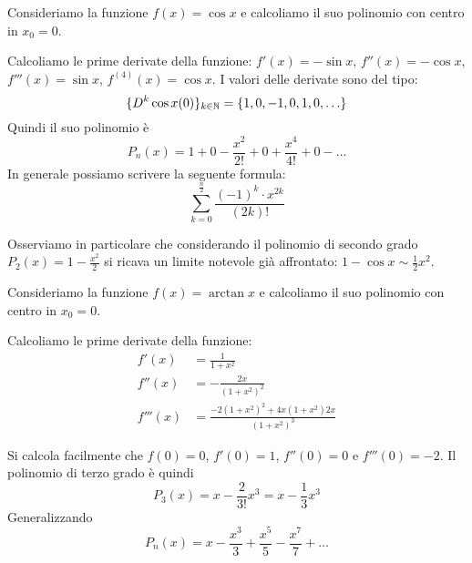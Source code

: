 \begin{example}
Consideriamo la funzione $f(x) = \cos x$ e calcoliamo il suo polinomio con centro in $x_0 = 0$.

Calcoliamo le prime derivate della funzione: $f'(x) = -\sin x$, $f''(x) = -\cos x$, $f'''(x) = \sin x$, $f^{(4)}(x) = \cos x$. I valori delle derivate sono del tipo:
\begin{equation*}
\{D^k \cos x (0)\}_{k \in \mathbb N} = \{1, 0, -1, 0, 1, 0, \ldots \}
\end{equation*}
Quindi il suo polinomio è
\begin{equation*}
P_n(x) = 1 + 0 - \frac{x^2}{2!} + 0 + \frac{x^4}{4!} + 0 - \ldots
\end{equation*}
In generale possiamo scrivere la seguente formula:
\begin{equation*}
\sum_{k = 0}^{\frac{n}{2}} \frac{(-1)^k \cdot x^{2k}}{(2k)!}
\end{equation*}

Osserviamo in particolare che considerando il polinomio di secondo grado $P_2(x) = 1 - \frac{x^2}{2}$ si ricava un limite notevole già affrontato: $ 1-\cos x \sim \frac{1}{2}x^2$.
\end{example}

\begin{example}
Consideriamo la funzione $f(x) = \arctan x$ e calcoliamo il suo polinomio con centro in $x_0 = 0$.

Calcoliamo le prime derivate della funzione:
\begin{align*}
f'(x) &= \frac{1}{1+x^2} \\
f''(x) &= - \frac{2x}{(1+x^2)^2} \\
f'''(x) &= \frac{-2(1+x^2)^2 + 4x(1+x^2)2x}{(1+x^2)^3}
\end{align*}

Si calcola facilmente che $f(0) = 0$, $f'(0) = 1$, $f''(0) = 0$ e $f'''(0) = -2$. Il polinomio di terzo grado è quindi
\begin{equation*}
P_3(x) = x - \frac{2}{3!}x^3 = x - \frac{1}{3}x^3
\end{equation*}
Generalizzando
\begin{equation*}
P_n(x) = x - \frac{x^3}{3} + \frac{x^5}{5} - \frac{x^7}{7} + \ldots
\end{equation*}
\end{example}

